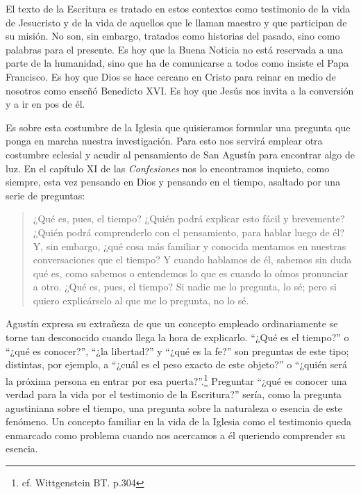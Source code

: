 El texto de la Escritura es tratado en estos contextos como testimonio de la
vida de Jesucristo y de la vida de aquellos que le llaman maestro y que
participan de su misión. No son, sin embargo, tratados como historias del
pasado, sino como palabras para el presente. Es hoy que la Buena Noticia no está
reservada a una parte de la humanidad, sino que ha de comunicarse a todos como
insiste el Papa Francisco. Es hoy que Dios se hace cercano en Cristo para reinar
en medio de nosotros como enseñó Benedicto XVI. Es hoy que Jesús nos invita a la
conversión y a ir en pos de él.

Es sobre esta costumbre de la Iglesia que quisieramos formular una pregunta que
ponga en marcha nuestra investigación. Para esto nos servirá emplear otra
costumbre eclesial y acudir al pensamiento de San Agustín para encontrar algo de
luz. En el capítulo XI de las \emph{Confesiones} nos lo encontramos inquieto,
como siempre, esta vez pensando en Dios y pensando en el tiempo, asaltado por
una serie de preguntas:

\blockquote[{\cite[XI.14 n.17]{confesiones}}]{¿Qué es, pues, el tiempo? ¿Quién
  podrá explicar esto fácil y brevemente? ¿Quién podrá comprenderlo con el
  pensamiento, para hablar luego de él? Y, sin embargo, ¿qué cosa más familiar y
  conocida mentamos en nuestras conversaciones que el tiempo? Y cuando hablamos
  de él, sabemos sin duda qué es, como sabemos o entendemos lo que es cuando lo
  oímos pronunciar a otro. ¿Qué es, pues, el tiempo? Si nadie me lo pregunta, lo
  sé; pero si quiero explicárselo al que me lo pregunta, no lo sé.}

      Agustín expresa su extrañeza de que un concepto empleado ordinariamente se
      torne tan desconocido cuando llega la hora de explicarlo. ``¿Qué es el
      tiempo?'' o ``¿qué es conocer?'', ``¿la libertad?'' y ``¿qué es la fe?'' son
      preguntas de este tipo; distintas, por ejemplo, a ``¿cuál es el peso exacto de
      este objeto?'' o ``¿quién será la próxima persona en entrar por esa
      puerta?''.\footnote{cf. Wittgenstein BT. p.304} Preguntar ``¿qué es conocer una
      verdad para la vida por el testimonio de la Escritura?'' sería, como la pregunta
      agustiniana sobre el tiempo, una pregunta sobre la naturaleza o esencia de
      este fenómeno. Un concepto familiar en la vida de la Iglesia como el
      testimonio queda enmarcado como problema cuando nos acercamos a él queriendo
      comprender su esencia.

